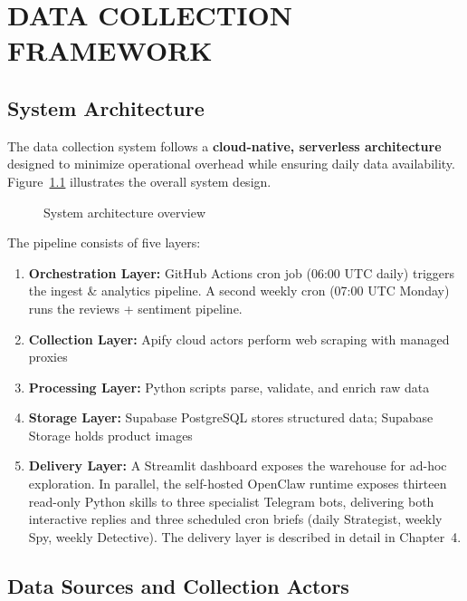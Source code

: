 \chapter{DATA COLLECTION FRAMEWORK}

\section{System Architecture}

The data collection system follows a \textbf{cloud-native, serverless architecture}
designed to minimize operational overhead while ensuring daily data availability.
Figure~\ref{fig:architecture} illustrates the overall system design.

\begin{figure}[H]
  \centering
  \caption{System architecture overview}
  \label{fig:architecture}
\end{figure}

The pipeline consists of five layers:
\begin{enumerate}
  \item \textbf{Orchestration Layer:} GitHub Actions cron job (06:00 UTC daily) triggers the ingest
  \& analytics pipeline. A second weekly cron (07:00 UTC Monday) runs the
  reviews + sentiment pipeline.
  \item \textbf{Collection Layer:} Apify cloud actors perform web scraping with managed proxies
  \item \textbf{Processing Layer:} Python scripts parse, validate, and enrich raw data
  \item \textbf{Storage Layer:} Supabase PostgreSQL stores structured data; Supabase Storage holds product images
  \item \textbf{Delivery Layer:} A Streamlit dashboard exposes the warehouse
  for ad-hoc exploration. In parallel, the self-hosted OpenClaw runtime
  exposes thirteen read-only Python skills to three specialist Telegram bots,
  delivering both interactive replies and three scheduled cron briefs
  (daily Strategist, weekly Spy, weekly Detective). The delivery layer is
  described in detail in Chapter~4.
\end{enumerate}

\section{Data Sources and Collection Actors}

